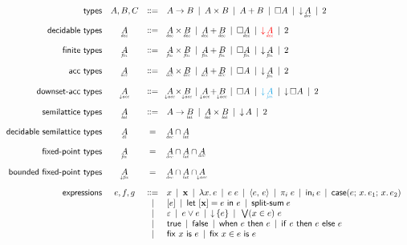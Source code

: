 \documentclass{article}
\begin{document}
\[
\begin{array}{rccl}
  \textsf{types} & A,B,C
  &\bnfeq& A \to B \pipe A \x B \pipe A + B
  \pipe \Disc{A} \pipe \Down{\eq{A}} \pipe \tbool
  \vspace{1em}\\

  \textsf{decidable types} & \eq{A}
  &\bnfeq& \eq{A} \x \eq{B} \pipe \eq{A} + \eq{B}
  \pipe \Disc{\eq{A}} \pipe {\color{red} \Down{\eq{A}}} \pipe \tbool
  \vspace{1em}\\

  \textsf{finite types} & \fin{A}
  &\bnfeq& \fin{A} \x \fin{B} \pipe \fin{A} + \fin{B}
  \pipe \Disc{\fin{A}} \pipe \Down{\fin{A}} \pipe \tbool
  \vspace{1em}\\

  \textsf{acc types} & \acc{A}
  &\bnfeq& \acc{A} \x \acc{B} \pipe \acc{A} + \acc{B}
  \pipe \Disc{A} \pipe \Down{\fin{A}} \pipe \tbool
  \vspace{1em}\\

  \textsf{downset-acc types} & \eltacc{A}
  &\bnfeq& \eltacc{A} \x \eltacc{B} \pipe \eltacc{A} + \eltacc{B}
  \pipe \Disc{A}
  \pipe {\color{Cerulean} \Down{\fin{A}}} \pipe \Down{\Disc{A}}
  \pipe \tbool
  \vspace{1em}\\

  \textsf{semilattice types} & \lat{A}
  &\bnfeq& A \to \lat{B} \pipe \lat{A} \x \lat{B} \pipe \Down{A} \pipe \tbool
  \vspace{1em}\\

  \textsf{decidable semilattice types} & \eqlat{A}
  &=& \eq{A} \cap \lat{A}
  \vspace{1em}\\

  \textsf{fixed-point types} & \fixtype{A}
  &=& \eq{A} \cap \lat{A} \cap \acc{A}
  \vspace{1em}\\

  \textsf{bounded fixed-point types} & \fixintype{A}
  &=& \eq{A} \cap \lat{A} \cap \eltacc{A}
  \vspace{1em}\\

  \textsf{expressions} & e,f,g
  &\bnfeq& x \pipe \d{x} \pipe \fn\bind{x} e \pipe e\; e
  \pipe \pair{e}{e} \pipe \pi_i\; e
  \pipe \inj{i}{e} \pipe \case{e}{x}{e_1}{x}{e_2} \\
  &&\pipe& \disc{e} \pipe \letdisc{\d{x}}{e}{e} \pipe \splitsum{e}\\
  &&\pipe& \unit \pipe e \vee e \pipe \downintro{e} \pipe \downelim{x}{e}{e}\\
  &&\pipe& \etrue \pipe \efalse \pipe \when{e}{e} \pipe \ifthen{e}{e}{e}\\
  &&\pipe& \fix{x}{e} \pipe \fixin{x}{e}{e}
\end{array}
\]
\end{document}
